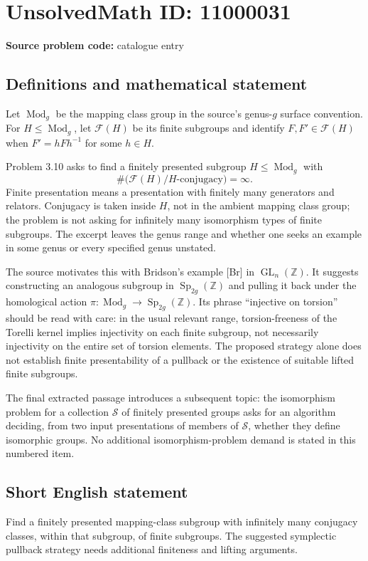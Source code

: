 \documentclass[11pt]{article}
\newcommand{\Z}{\mathbb{Z}}
\begin{document}
\section*{UnsolvedMath ID: 11000031}
\textbf{Source problem code:} catalogue entry
\subsection{Definitions and mathematical statement}
Let $\operatorname{Mod}_g$ be the mapping class group in the source's genus-$g$ surface convention. For $H\leq\operatorname{Mod}_g$, let $\mathcal F(H)$ be its finite subgroups and identify $F,F'\in\mathcal F(H)$ when $F'=hFh^{-1}$ for some $h\in H$.

Problem 3.10 asks to find a finitely presented subgroup $H\leq\operatorname{Mod}_g$ with
\[
 \#\bigl(\mathcal F(H)/H\text{-conjugacy}\bigr)=\infty.
\]
Finite presentation means a presentation with finitely many generators and relators. Conjugacy is taken inside $H$, not in the ambient mapping class group; the problem is not asking for infinitely many isomorphism types of finite subgroups. The excerpt leaves the genus range and whether one seeks an example in some genus or every specified genus unstated.

The source motivates this with Bridson's example [Br] in $\operatorname{GL}_n(\Z)$. It suggests constructing an analogous subgroup in $\operatorname{Sp}_{2g}(\Z)$ and pulling it back under the homological action $\pi:\operatorname{Mod}_g\to\operatorname{Sp}_{2g}(\Z)$. Its phrase ``injective on torsion'' should be read with care: in the usual relevant range, torsion-freeness of the Torelli kernel implies injectivity on each finite subgroup, not necessarily injectivity on the entire set of torsion elements. The proposed strategy alone does not establish finite presentability of a pullback or the existence of suitable lifted finite subgroups.

The final extracted passage introduces a subsequent topic: the isomorphism problem for a collection $\mathcal S$ of finitely presented groups asks for an algorithm deciding, from two input presentations of members of $\mathcal S$, whether they define isomorphic groups. No additional isomorphism-problem demand is stated in this numbered item.
\subsection{Short English statement}
Find a finitely presented mapping-class subgroup with infinitely many conjugacy classes, within that subgroup, of finite subgroups. The suggested symplectic pullback strategy needs additional finiteness and lifting arguments.
\end{document}
